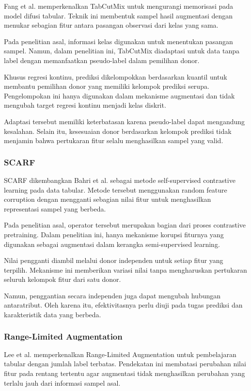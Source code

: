 Fang et al. \cite{ref12} memperkenalkan TabCutMix untuk mengurangi memorisasi pada model difusi tabular. Teknik ini membentuk sampel hasil augmentasi dengan menukar sebagian fitur antara pasangan observasi dari kelas yang sama.

Pada penelitian asal, informasi kelas digunakan untuk menentukan pasangan sampel. Namun, dalam penelitian ini, TabCutMix diadaptasi untuk data tanpa label dengan memanfaatkan pseudo-label dalam pemilihan donor.

Khusus regresi kontinu, prediksi dikelompokkan berdasarkan kuantil untuk membantu pemilihan donor yang memiliki kelompok prediksi serupa. Pengelompokan ini hanya digunakan dalam mekanisme augmentasi dan tidak mengubah target regresi kontinu menjadi kelas diskrit.

Adaptasi tersebut memiliki keterbatasan karena pseudo-label dapat mengandung kesalahan. Selain itu, kesesuaian donor berdasarkan kelompok prediksi tidak menjamin bahwa pertukaran fitur selalu menghasilkan sampel yang valid.

\subsubsection{SCARF}

SCARF dikembangkan Bahri et al. \cite{ref7} sebagai metode self-supervised contrastive learning pada data tabular. Metode tersebut menggunakan random feature corruption dengan mengganti sebagian nilai fitur untuk menghasilkan representasi sampel yang berbeda.

Pada penelitian asal, operator tersebut merupakan bagian dari proses contrastive pretraining. Dalam penelitian ini, hanya mekanisme korupsi fiturnya yang digunakan sebagai augmentasi dalam kerangka semi-supervised learning.

Nilai pengganti diambil melalui donor independen untuk setiap fitur yang terpilih. Mekanisme ini memberikan variasi nilai tanpa mengharuskan pertukaran seluruh kelompok fitur dari satu donor.

Namun, penggantian secara independen juga dapat mengubah hubungan antaratribut. Oleh karena itu, efektivitasnya perlu diuji pada tugas prediksi dan karakteristik data yang berbeda.

\subsubsection{Range-Limited Augmentation}

Lee et al. \cite{ref13} memperkenalkan Range-Limited Augmentation untuk pembelajaran tabular dengan jumlah label terbatas. Pendekatan ini membatasi perubahan nilai fitur pada rentang tertentu agar augmentasi tidak menghasilkan perubahan yang terlalu jauh dari informasi sampel asal.

